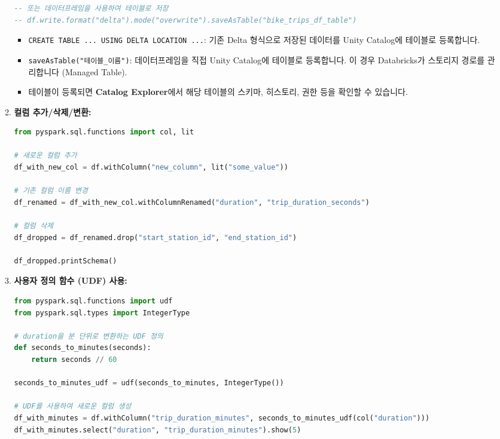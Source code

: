 \documentclass[11pt,a4paper]{article}
\theoremstyle{definition}
\begin{document}
\begin{itemize}
\begin{enumerate}
\begin{lstlisting}[language=sql, caption={Delta 테이블 생성 및 등록 예시}]
-- 또는 데이터프레임을 사용하여 테이블로 저장
-- df.write.format("delta").mode("overwrite").saveAsTable("bike_trips_df_table")
        \end{lstlisting}
        \begin{itemize}
            \item \texttt{CREATE TABLE ... USING DELTA LOCATION ...}: 기존 Delta 형식으로 저장된 데이터를 Unity Catalog에 테이블로 등록합니다.
            \item \texttt{saveAsTable("테이블_이름")}: 데이터프레임을 직접 Unity Catalog에 테이블로 등록합니다. 이 경우 Databricks가 스토리지 경로를 관리합니다 (Managed Table).
            \item 테이블이 등록되면 \textbf{Catalog Explorer}에서 해당 테이블의 스키마, 히스토리, 권한 등을 확인할 수 있습니다.
        \end{itemize}
    \item \textbf{컬럼 추가/삭제/변환:}
        \begin{lstlisting}[language=python, caption={데이터프레임 컬럼 조작 예시}]
from pyspark.sql.functions import col, lit

# 새로운 컬럼 추가
df_with_new_col = df.withColumn("new_column", lit("some_value"))

# 기존 컬럼 이름 변경
df_renamed = df_with_new_col.withColumnRenamed("duration", "trip_duration_seconds")

# 컬럼 삭제
df_dropped = df_renamed.drop("start_station_id", "end_station_id")

df_dropped.printSchema()
        \end{lstlisting}
    \item \textbf{사용자 정의 함수 (UDF) 사용:}
        \begin{lstlisting}[language=python, caption={사용자 정의 함수 (UDF) 예시}]
from pyspark.sql.functions import udf
from pyspark.sql.types import IntegerType

# duration을 분 단위로 변환하는 UDF 정의
def seconds_to_minutes(seconds):
    return seconds // 60

seconds_to_minutes_udf = udf(seconds_to_minutes, IntegerType())

# UDF를 사용하여 새로운 컬럼 생성
df_with_minutes = df.withColumn("trip_duration_minutes", seconds_to_minutes_udf(col("duration")))
df_with_minutes.select("duration", "trip_duration_minutes").show(5)
        \end{lstlisting}
\end{enumerate}

\newpage


\end{itemize}
\end{document}

